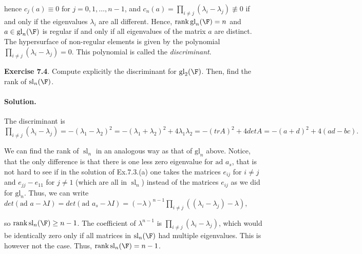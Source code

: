 \documentclass[11pt]{article}
\DeclareMathOperator{\rank}{rank}
\DeclareMathOperator{\sla}{sl}
\newcommand{\gl}{\mbox{gl}}
\newcommand{\ad}{\mbox{ad\ }}
\newcommand{\sk}{\vspace*{1em}}
\begin{document}
hence $c_j(a)\equiv 0$ for $j=0, 1, \ldots, n-1$, and $c_n(a)=\prod_{i\ne j}(\lambda_{i}-\lambda_{j})\not \equiv 0$ if and only if the eigenvalues $\lambda_i$ are all different. Hence, $\rank \gl_n(\F)=n$ and $a \in \gl_n(\F)$ is regular if and only if all eigenvalues of the matrix $a$ are distinct. The hypersurface of non-regular elements is given by the polynomial $\prod_{i\ne j}(\lambda_{i}-\lambda_{j})=0$. This polynomial is called the \textit{discriminant}. 




\sk\noindent
{\bf Exercise 7.4}.
 Compute explicitly the discriminant for $\gl_{2}(\F)$. Then,  find the rank of $\sla_{n}(\F)$.\\


\paragraph{Solution.}

The discriminant is $\prod_{i\ne j}(\lambda_{i}-\lambda_{j})=-(\lambda_{1}-\lambda_{2})^{2}=-(\lambda_1+\lambda_2)^2 +4\lambda_1 \lambda_2=-(trA)^2+4 detA=-(a+d)^2+4(ad-bc).$

 We can find  the rank of $\sla_n$ in an analogous way as that of $\gl_n$ above. Notice, that the only difference is that there is one less zero eigenvalue for $\ad a_s$, that is not hard to see if in the solution of Ex.7.3.(a) one takes the matrices $e_{ij}$ for $i\neq j$ and $e_{jj}-e_{11}$ for $j\neq 1$ (which are all in $\sla_n$) instead of the matrices $e_{ij}$ as we did for $\gl_n$. Thus, we can    write 
$det(\ad a-\lambda I)=det(\ad a_{s}-\lambda I)
=(-\lambda)^{n-1}\prod_{i\ne j}
((\lambda_{i}-\lambda_{j})-\lambda),$

 so $\rank\sla_{n}(\F)\ge n-1$. The coefficient of $\lambda^{n-1}$ is
 $\prod_{i\ne j}(\lambda_{i}-\lambda_{j})$, which would be identically zero only if all matrices in $\sla_{n}(\F)$ had
multiple eigenvalues. This is however not the case. Thus, $\rank\sla_{n}(\F)=n-1$.
\end{document}
